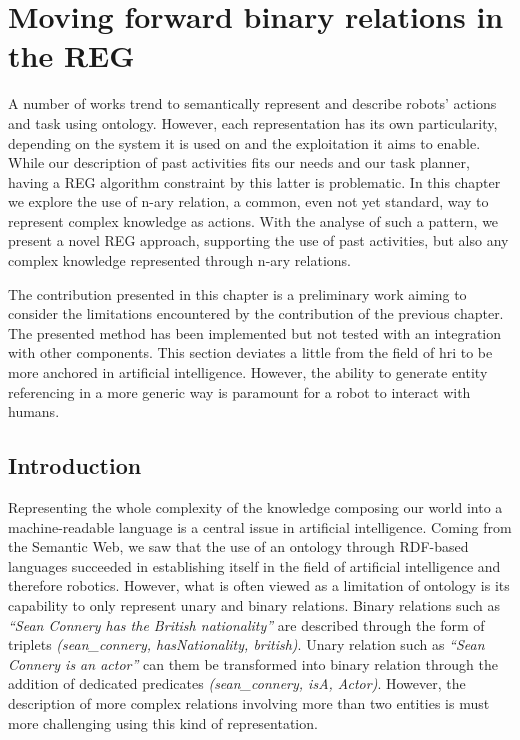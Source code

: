 \ifdefined{}
\else
\setcounter{chapter}{7} %
\dominitoc
\faketableofcontents
\fi

\chapter{Moving forward binary relations in the REG}
\minitoc
\label{chap:7}

A number of works trend to semantically represent and describe robots' actions and task using ontology. However, each representation has its own particularity, depending on the system it is used on and the exploitation it aims to enable. While our description of past activities fits our needs and our task planner, having a REG algorithm constraint by this latter is problematic. In this chapter we explore the use of n-ary relation, a common, even not yet standard, way to represent complex knowledge as actions. With the analyse of such a pattern, we present a novel REG approach, supporting the use of past activities, but also any complex knowledge represented through n-ary relations.

The contribution presented in this chapter is a preliminary work aiming to consider the limitations encountered by the contribution of the previous chapter. The presented method has been implemented but not tested with an integration with other components. This section deviates a little from the field of \acrshort{hri} to be more anchored in artificial intelligence. However, the ability to generate entity referencing in a more generic way is paramount for a robot to interact with humans. 

\section{Introduction}

Representing the whole complexity of the knowledge composing our world into a machine-readable language is a central issue in artificial intelligence. Coming from the Semantic Web, we saw that the use of an ontology through RDF-based languages succeeded in establishing itself in the field of artificial intelligence and therefore robotics. However, what is often viewed as a limitation of ontology is its capability to only represent unary and binary relations. Binary relations such as \textit{``Sean Connery has the British nationality''} are described through the form of triplets \textit{(sean\_connery, hasNationality, british)}. Unary relation such as \textit{``Sean Connery is an actor''} can them be transformed into binary relation through the addition of dedicated predicates \textit{(sean\_connery, isA, Actor)}. However, the description of more complex relations involving more than two entities is must more challenging using this kind of representation.

